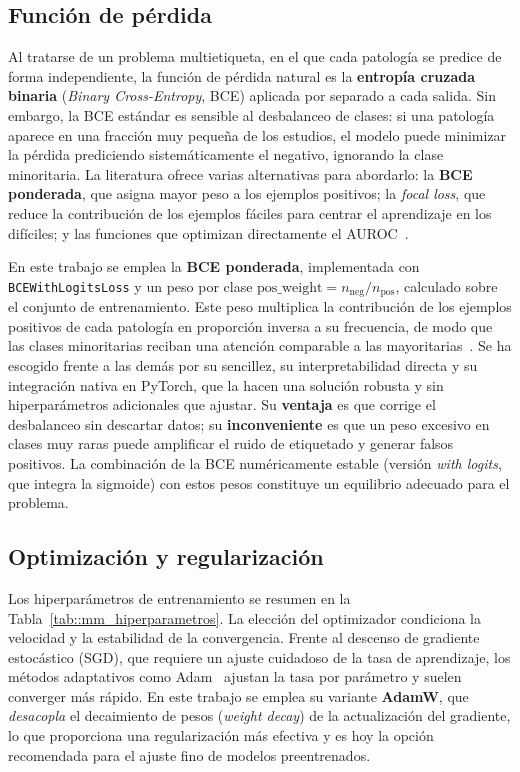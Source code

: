 \subsection{Función de pérdida}

Al tratarse de un problema multietiqueta, en el que cada patología se predice de
forma independiente, la función de pérdida natural es la \textbf{entropía cruzada
binaria} (\textit{Binary Cross-Entropy}, BCE) aplicada por separado a cada salida.
Sin embargo, la BCE estándar es sensible al desbalanceo de clases: si una
patología aparece en una fracción muy pequeña de los estudios, el modelo puede
minimizar la pérdida prediciendo sistemáticamente el negativo, ignorando la clase
minoritaria. La literatura ofrece varias alternativas para abordarlo: la
\textbf{BCE ponderada}, que asigna mayor peso a los ejemplos positivos; la
\textit{focal loss}, que reduce la contribución de los ejemplos fáciles para
centrar el aprendizaje en los difíciles; y las funciones que optimizan
directamente el AUROC~\cite{yuanLargeScaleRobustDeepAUC2021}.

En este trabajo se emplea la \textbf{BCE ponderada}, implementada con
\texttt{BCEWithLogitsLoss} y un peso por clase
$\text{pos\_weight} = n_{\text{neg}} / n_{\text{pos}}$, calculado sobre el
conjunto de entrenamiento. Este peso multiplica la contribución de los ejemplos
positivos de cada patología en proporción inversa a su frecuencia, de modo que
las clases minoritarias reciban una atención comparable a las
mayoritarias~\cite{usharubyBinaryCrossEntropy2020}. Se ha escogido frente a las
demás por su sencillez, su interpretabilidad directa y su integración nativa en
PyTorch, que la hacen una solución robusta y sin hiperparámetros adicionales que
ajustar. Su \textbf{ventaja} es que corrige el desbalanceo sin descartar datos;
su \textbf{inconveniente} es que un peso excesivo en clases muy raras puede
amplificar el ruido de etiquetado y generar falsos positivos. La combinación de
la BCE numéricamente estable (versión \textit{with logits}, que integra la
sigmoide) con estos pesos constituye un equilibrio adecuado para el problema.

\subsection{Optimización y regularización}

Los hiperparámetros de entrenamiento se resumen en la
Tabla~\ref{tab::mm_hiperparametros}. La elección del optimizador condiciona la
velocidad y la estabilidad de la convergencia. Frente al descenso de gradiente
estocástico (SGD), que requiere un ajuste cuidadoso de la tasa de aprendizaje,
los métodos adaptativos como Adam~\cite{kingmaAdamMethod2015} ajustan la tasa por
parámetro y suelen converger más rápido. En este trabajo se emplea su variante
\textbf{AdamW}, que \textit{desacopla} el decaimiento de pesos
(\textit{weight decay}) de la actualización del gradiente, lo que proporciona una
regularización más efectiva y es hoy la opción recomendada para el ajuste fino de
modelos preentrenados.

